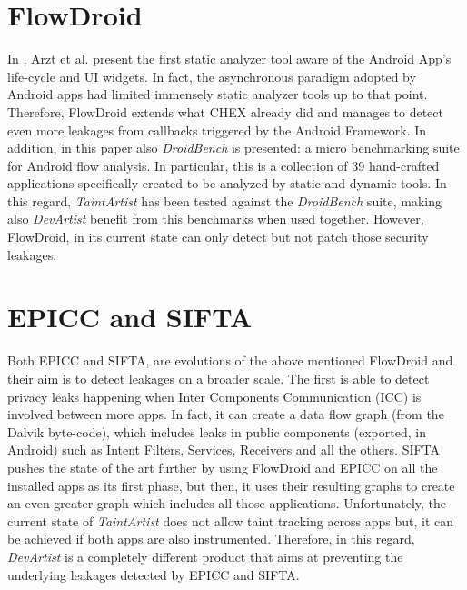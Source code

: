 \section{FlowDroid}
In \cite{flowdroid}, Arzt et al. present the first static analyzer tool aware of the Android App's life-cycle and UI widgets. In fact, the asynchronous paradigm adopted by Android apps had limited immensely static analyzer tools up to that point. Therefore, FlowDroid extends what CHEX already did and manages to detect even more leakages from callbacks triggered by the Android Framework. In addition, in this paper also \emph{DroidBench} is presented: a micro benchmarking suite for Android flow analysis. In particular, this is a collection of 39 hand-crafted applications specifically created to be analyzed by static and dynamic tools. In this regard, \emph{TaintArtist} has been tested against the \emph{DroidBench} suite, making also \emph{DevArtist} benefit from this benchmarks when used together. However, FlowDroid, in its current state can only detect but not patch those security leakages.

\section{EPICC and SIFTA}
Both EPICC\cite{epicc} and SIFTA\cite{sifta}, are evolutions of the above mentioned FlowDroid and their aim is to detect leakages on a broader scale. The first is able to detect privacy leaks happening when Inter Components Communication (ICC) is involved between more apps. In fact, it can create a data flow graph (from the Dalvik byte-code), which includes leaks in public components (exported, in Android) such as Intent Filters, Services, Receivers and all the others. SIFTA pushes the state of the art further by using FlowDroid and EPICC on all the installed apps as its first phase, but then, it uses their resulting graphs to create an even greater graph which includes all those applications. Unfortunately, the current state of \emph{TaintArtist} does not allow taint tracking across apps but, it can be achieved if both apps are also instrumented. Therefore, in this regard, \emph{DevArtist} is a completely different product that aims at preventing the underlying leakages detected by EPICC and SIFTA. 

